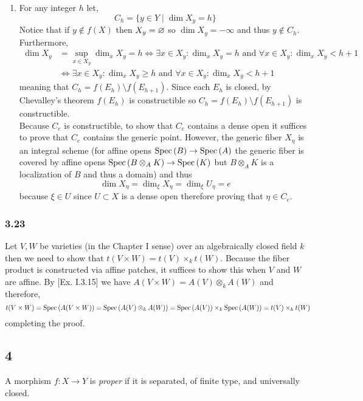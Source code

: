 \documentclass[12pt]{article}
\begin{document}
\begin{enumerate}
\item For any integer $h$ let,
\[ C_h = \{ y \in Y \mid \dim{X_y} = h \} \]
Notice that if $y \notin f(X)$ then $X_y = \varnothing$ so $\dim{X_y} = - \infty$ and thus $y \notin C_h$. Furthermore, 
\begin{align*}
\dim{X_y} & = \sup_{x \in X_y} \dim_x X_y = h \iff \exists x \in X_y : \dim_x{X_y} = h \text{ and } \forall x \in X_y : \dim_x{X_y} < h + 1 \
\\
& \iff \exists x \in X_y : \dim_x{X_y} \ge h \text{ and } \forall x \in X_y : \dim_x{X_y} < h + 1
\end{align*}
meaning that $C_h = f(E_h) \setminus f(E_{h+1})$. Since each $E_h$ is closed, by Chevalley's theorem $f(E_h)$ is constructible so $C_h = f(E_h) \setminus f(E_{h+1})$ is constructible.
\bigskip\\
Because $C_e$ is constructible, to show that $C_e$ contains a dense open it suffices to prove that $C_e$ contains the generic point. However, the generic fiber $X_{\eta}$ is an integral scheme (for affine opens $\mathrm{Spec}\left( B \right) \to \mathrm{Spec}\left( A \right)$ the generic fiber is covered by affine opens $\mathrm{Spec}\left( B \otimes_A K \right) \to \mathrm{Spec}\left( K \right)$ but $B \otimes_A K$ is a localization of $B$ and thus a domain) and thus 
\[ \dim{X_{\eta}} = \dim_{\xi}{X_{\eta}} = \dim_{\xi}{U_{\eta}} = e \]
because $\xi \in U$ since $U \subset X$ is a dense open therefore proving that $\eta \in C_e$.
\end{enumerate}

\subsubsection{3.23}

Let $V, W$ be varieties (in the Chapter I sense) over an algebraically closed field $k$ then we need to show that $t(V \times W) = t(V) \times_k t(W)$. Because the fiber product is constructed via affine patches, it suffices to show this when $V$ and $W$ are affine. By [Ex. I.3.15] we have $A(V \times W) = A(V) \otimes_k A(W)$ and therefore,
\[ t(V \times W) = \mathrm{Spec}\left( A(V \times W) \right) = \mathrm{Spec}\left( A(V) \otimes_k A(W) \right) = \mathrm{Spec}\left( A(V) \right) \times_k \mathrm{Spec}\left( A(W) \right) = t(V) \times_k t(W) \]
completing the proof.

\subsection{4}

\begin{definition}
A morphism $f : X \to Y$ is \textit{proper} if it is separated, of finite type, and universally closed. 
\end{definition}
\end{document}
